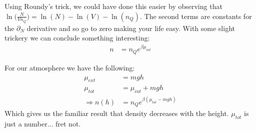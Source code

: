 \documentclass[a4paper, 11pt]{article}
\begin{document}
	\noindent Using Roundy's trick, we could have done this easier by observing that $\ln\Big(\frac{N}{Vn_Q}\Big) = \ln(N)-\ln(V)-\ln(n_Q)$. The second terms are constants for the $\partial_N$ derivative and so go to zero making your life easy. With some slight trickery we can conclude something interesting: 
		\begin{align*}
			n &= n_Q e^{\beta \mu_{int}}
		\end{align*} 
	
	\noindent For our atmosphere we have the following: 
		\begin{align*}
			\mu_{ext} &= mgh \\ 
			\mu_{tot} &= \mu_{int} + mgh \\ 
			\Rightarrow n(h) &= n_Qe^{\beta (\mu_{tot}-mgh)}
		\end{align*}
	\noindent Which gives us the familiar result that density decreases with the height. $\mu_{tot}$ is just a number... fret not. 
\end{document}
